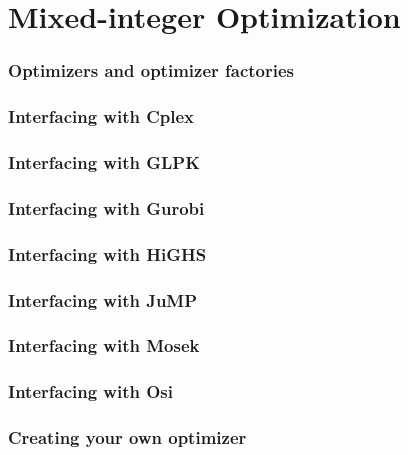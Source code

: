 \part{Mixed-integer Optimization}



\section{Optimizers and optimizer factories}
\section{Interfacing with \textsf{Cplex}}
\section{Interfacing with \textsf{GLPK}}
\section{Interfacing with \textsf{Gurobi}}
\section{Interfacing with \textsf{HiGHS}}
\section{Interfacing with \textsf{JuMP}}
\section{Interfacing with \textsf{Mosek}}
\section{Interfacing with \textsf{Osi}}
\section{Creating your own optimizer}





